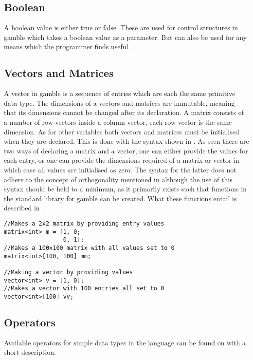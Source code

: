 \subsection*{Boolean}
A boolean value is either true or false. 
These are used for control structures in \gls{gamble} which takes a boolean value as a parameter. 
But can also be used for any means which the programmer finds useful. 

\subsection*{Vectors and Matrices}
A vector in \gls{gamble} is a sequence of entries which are each the same primitive data type. 
The dimensions of a vectors and matrices are immutable, meaning that its dimensions cannot be changed after its declaration. 
A matrix consists of a number of row vectors inside a column vector, each row vector is the same dimension. 
As for other variables both vectors and matrices must be initialised when they are declared. 
This is done with the syntax shown in .
As seen there are two ways of declaring a matrix and a vector, one can either provide the values for each entry, or one can provide the dimensions required of a matrix or vector in which case all values are initialised as zero.
The syntax for the latter does not adhere to the concept of orthogonality mentioned in  although the use of this syntax should be held to a minimum, as it primarily exists such that functions in the standard library for \gls{gamble} can be created.
What these functions entail is described in .

\begin{lstlisting}[caption={Syntax for creating a matrix or vector},label={lst:matrix},numbers=none]
//Makes a 2x2 matrix by providing entry values
matrix<int> m = [1, 0; 
                 0, 1];
//Makes a 100x100 matrix with all values set to 0
matrix<int>[100, 100] mm;

//Making a vector by providing values
vector<int> v = [1, 0];
//Makes a vector with 100 entries all set to 0
vector<int>[100] vv;
\end{lstlisting}

\subsection*{Operators}\label{subsec:operators}
Available operators for simple data types in the language can be found on  with a short description.  


